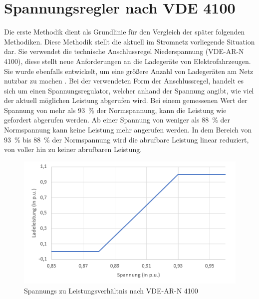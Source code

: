 \section{Spannungsregler nach VDE 4100}
\label{capBody:VDE}
Die erste Methodik dient als Grundlinie für den Vergleich der später folgenden Methodiken. Diese Methodik stellt die aktuell im Stromnetz vorliegende Situation dar. Sie verwendet die technische Anschlussregel Niederspannung (VDE-AR-N 4100), diese stellt neue Anforderungen an die Ladegeräte von Elektrofahrzeugen. Sie wurde ebenfalls entwickelt, um eine größere Anzahl von Ladegeräten am Netz nutzbar zu machen \cite{kutter2020}. Bei der verwendeten Form der Anschlussregel, handelt es sich um einen Spannungsregulator, welcher anhand der Spannung angibt, wie viel der aktuell möglichen Leistung abgerufen wird. Bei einem gemessenen Wert der Spannung von mehr als 93~\% der Normspannung, kann die Leistung wie gefordert abgerufen werden. Ab einer Spannung von weniger als 88~\% der Normspannung kann keine Leistung mehr angerufen werden. In dem Bereich von 93~\% bis 88~\% der Normspannung wird die abrufbare Leistung linear reduziert, von voller hin zu keiner abrufbaren Leistung.

\begin{figure}[htb]
	\includegraphics[width=\linewidth]{img/VDE3.png}
	\caption{Spannungs zu Leistungsverhältnis nach VDE-AR-N 4100}
	\label{Abb_VDEController}
\end{figure}

